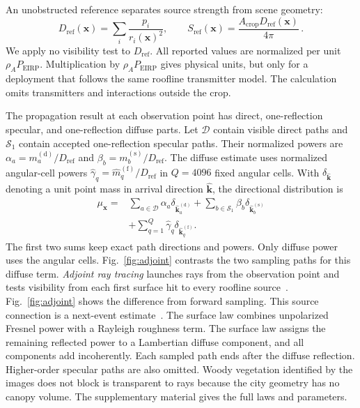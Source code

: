 \documentclass{IEEEoj}
\providecommand{\DIFadd}[1]{{\protect\color{blue} \sf #1}} %
\providecommand{\DIFdel}[1]{{\protect\color{red} \scriptsize #1}} %
\providecommand{\DIFaddbegin}{} %
\providecommand{\DIFaddend}{} %
\providecommand{\DIFdelbegin}{} %
\providecommand{\DIFdelend}{} %
\begin{document}
An unobstructed reference separates source strength from scene geometry:
\begin{equation}
D_{\mathrm{ref}}(\mathbf{x})=
\sum_i\frac{p_i}{r_i(\mathbf{x})^2},
\qquad
S_{\mathrm{ref}}(\mathbf{x})=
\frac{A_{\mathrm{crop}}D_{\mathrm{ref}}(\mathbf{x})}{4\pi} \, .
\label{eq:reference-scale}
\end{equation}
We apply no visibility test to $D_{\mathrm{ref}}$. All reported values are
normalized per unit $\rho_A P_{\mathrm{EIRP}}$. Multiplication by
$\rho_A P_{\mathrm{EIRP}}$ gives physical units, but only for a deployment
that follows the same roofline transmitter model. The calculation omits
transmitters and interactions outside the crop.

The propagation result at each observation point has direct, one-reflection
specular, and one-reflection diffuse parts. Let $\mathcal{D}$ contain visible direct
paths and $\mathcal{S}_1$ contain accepted one-reflection specular
paths. Their normalized powers are
$\alpha_a=m_a^{(\mathrm{d})}/D_{\mathrm{ref}}$ and
$\beta_b=m_b^{(\mathrm{s})}/D_{\mathrm{ref}}$. The diffuse estimate uses
normalized angular-cell powers
$\widehat{\gamma}_q=\widehat{m}_q^{(\mathrm{f})}/D_{\mathrm{ref}}$ in
$Q=4096$ fixed angular cells. With $\delta_{\widehat{\mathbf{k}}}$ denoting a unit point
mass in arrival direction $\widehat{\mathbf{k}}$, the directional distribution is
\begin{equation}
\begin{aligned}
\mu_{\mathbf{x}}={}&
\sum_{a\in\mathcal{D}}\alpha_a\delta_{\widehat{\mathbf{k}}_a^{(\mathrm{d})}}
+\sum_{b\in\mathcal{S}_1}\beta_b\delta_{\widehat{\mathbf{k}}_b^{(\mathrm{s})}} \\
&+\sum_{q=1}^{Q}\widehat{\gamma}_q\delta_{\widehat{\mathbf{k}}_q^{(\mathrm{f})}} .
\end{aligned}
\label{eq:first-material-transfer}
\end{equation}
The first two sums keep exact path directions and powers. Only diffuse power
uses the angular cells. \DIFaddbegin \DIFadd{Fig.~\ref{fig:adjoint} contrasts the two sampling paths
for this diffuse term. }\DIFaddend \emph{Adjoint ray tracing} launches rays from the
observation point and tests visibility from each first surface hit to every
roofline source~\cite{behlouli2014,cocheril2007}. \DIFdelbegin \DIFdel{Fig.~\ref{fig:adjoint} shows
the difference from forward sampling. }\DIFdelend This source connection is a next-event
estimate~\cite{veach}. The surface law combines unpolarized Fresnel power with
a Rayleigh roughness term. The surface law assigns the remaining reflected power to a
Lambertian diffuse component, and all components add incoherently. Each sampled
path ends after the diffuse reflection. Higher-order specular paths are also
omitted. Woody vegetation identified by the images \DIFdelbegin \DIFdel{does not block }\DIFdelend \DIFaddbegin \DIFadd{is transparent to }\DIFaddend rays
because the city geometry has no canopy volume. The supplementary material gives the
full laws and parameters.
\end{document}
